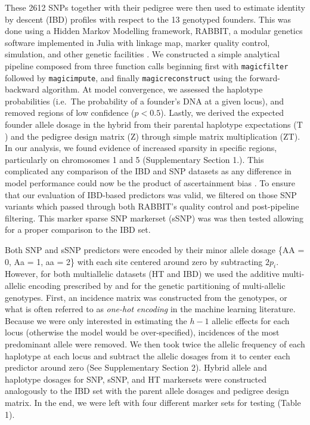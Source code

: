 \begin{refsection}
These 2612 SNPs together with their pedigree were then used to estimate
identity by descent (IBD) profiles with respect to the 13 genotyped
founders. This was done using a Hidden Markov Modelling framework,
RABBIT, a modular genetics software implemented in Julia with linkage
map, marker quality control, simulation, and other genetic facilities
\parencite{Zheng2015}. We constructed a simple analytical pipeline
composed from three function calls beginning first with
\texttt{magicfilter} followed by \texttt{magicimpute}, and finally
\texttt{magicreconstruct} using the forward-backward algorithm. At model
convergence, we assessed the haplotype probabilities (i.e.~The
probability of a founder's DNA at a given locus), and removed regions of
low confidence (\(p < 0.5\)). Lastly, we derived the expected founder
allele dosage in the hybrid from their parental haplotype expectations
(\(\mathrm T\)) and the pedigree design matrix (\(\mathrm Z\)) through
simple matrix multiplication (\(\mathrm{ZT}\)). In our analysis, we
found evidence of increased sparsity in specific regions,
particularly on chromosomes 1 and 5 (Supplementary Section 1.). This complicated any
comparison of the IBD and SNP datasets as any difference in model
performance could now be the product of ascertainment bias
\parencite{Heslot2013}. To ensure that our evaluation of IBD-based
predictors was valid, we filtered on those SNP variants which passed
through both RABBIT's quality control and post-pipeline filtering.
This marker sparse SNP markerset (sSNP) was was then tested allowing for a proper comparison to the IBD set.

Both SNP and sSNP predictors were encoded by their minor allele dosage
\{AA = 0, Aa = 1, aa = 2\} with each site centered around zero by
subtracting \(2p_i\). However, for both multiallelic datasets (HT and
IBD) we used the additive multi-allelic encoding prescribed by
\parencite{Da2015} and \parencite{Schaid2004} for the genetic partitioning
of multi-allelic genotypes. First, an incidence matrix was constructed from the
genotypes, or what is often referred to as \emph{one-hot encoding} in
the machine learning literature. Because we were only interested in
estimating the \(h - 1\) allelic effects for each locus (otherwise the
model would be over-specified), incidences of the most predominant
allele were removed. We then took twice the allelic frequency of each
haplotype at each locus and subtract the allelic dosages from it to
center each predictor around zero (See Supplementary Section 2). Hybrid allele and haplotype dosages
for SNP, sSNP, and HT markersets were constructed analogously to the IBD
set with the parent allele dosages and pedigree design matrix. In the
end, we were left with four different marker sets for testing (Table 1).


\end{refsection}
